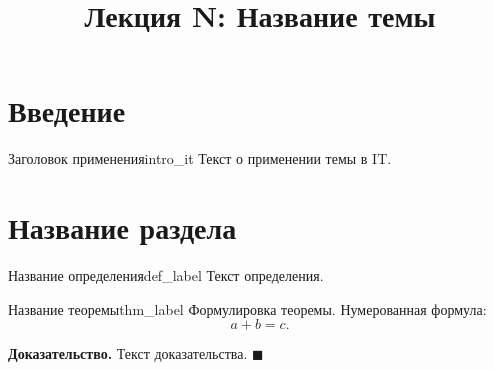 \documentclass[12pt,a4paper]{article}
\title{Лекция N: Название темы}
\author{}
\date{}
\newenvironment{myproof}{\noindent\textbf{Доказательство.}}{\hfill$\blacksquare$}
\begin{document}
\maketitle
\thispagestyle{fancy}


\section*{Введение}

\begin{remarkIT}{Заголовок применения}{intro_it}
  Текст о применении темы в IT.
\end{remarkIT}

\section*{Название раздела}

\begin{definition}{Название определения}{def_label}
  Текст определения.
\end{definition}

\begin{theorem}{Название теоремы}{thm_label}
  Формулировка теоремы. Нумерованная формула:
  \begin{equation}
    a + b = c. \tag{N.1}
  \end{equation}
\end{theorem}

\begin{myproof}
  Текст доказательства.
\end{myproof}
\end{document}

